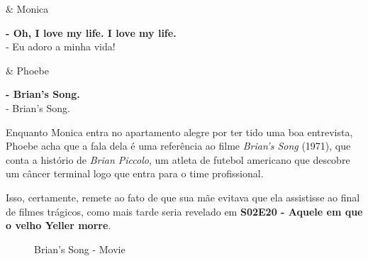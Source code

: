 \begin{tcolorbox}[enhanced,center upper,
    drop fuzzy shadow southeast, boxrule=0.3pt,
    lower separated=false,
    colframe=black!30!dialogoBorder,colback=white]
\begin{minipage}[c]{0.16\linewidth}
   & \centering \scriptsize{Monica}
\end{minipage}
\hfill
\begin{minipage}[c]{0.8\linewidth}
  \textbf{- Oh, I love my life. I love my life.}\\
  - Eu adoro a minha vida!
\end{minipage}

\medskip
\begin{minipage}[c]{0.16\linewidth}
   & \centering \scriptsize{Phoebe}
\end{minipage}
\hfill
\begin{minipage}[c]{0.8\linewidth}
  \textbf{- Brian's Song.}\\
  - Brian's Song.
\end{minipage}
\end{tcolorbox}

Enquanto Monica entra no apartamento alegre por ter tido uma boa
entrevista, Phoebe acha que a fala dela é uma referência ao filme
\emph{Brian's Song} (1971), que conta a histório de \emph{Brian
Piccolo}, um atleta de futebol americano que descobre um câncer terminal
logo que entra para o time profissional.

Isso, certamente, remete ao fato de que sua mãe evitava que ela
assistisse ao final de filmes trágicos, como mais tarde seria revelado
em
\textbf{\textcolor{primarycolor}{S02E20 - Aquele em que o velho Yeller morre}}.

\begin{figure}
  \centering
    \caption{Brian’s Song - Movie\label{fig:brian-s-song-movie}}
\end{figure}

